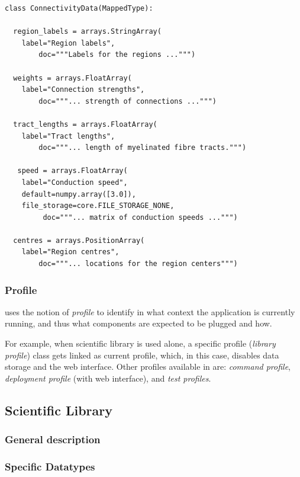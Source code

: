 \begin{lstlisting}
class ConnectivityData(MappedType):

  region_labels = arrays.StringArray( 
	label="Region labels", 
        doc="""Labels for the regions ...""")

  weights = arrays.FloatArray( 
	label="Connection strengths",
        doc="""... strength of connections ...""")

  tract_lengths = arrays.FloatArray( 
	label="Tract lengths",
        doc="""... length of myelinated fibre tracts.""")

   speed = arrays.FloatArray( 
	label="Conduction speed", 
	default=numpy.array([3.0]), 
	file_storage=core.FILE_STORAGE_NONE,
         doc="""... matrix of conduction speeds ...""")

  centres = arrays.PositionArray( 
	label="Region centres",
        doc="""... locations for the region centers""")
\end{lstlisting}

	\subsubsection{Profile}

\TVB uses the notion of \emph{profile} to identify in what context the application is currently running,
and thus what components are expected to be plugged and how.

For example, when \TVB scientific library is used alone, a specific profile (\emph{library profile}) class 
gets linked as current profile, which, in this case, disables data storage and the web interface. Other profiles available
in \TVB are: \emph{command profile}, \emph{deployment profile} (with web interface), and \emph{test profiles}.

	\subsection{\TVB Scientific Library}

	\subsubsection{General description}

	\subsubsection{\TVB Specific Datatypes}


